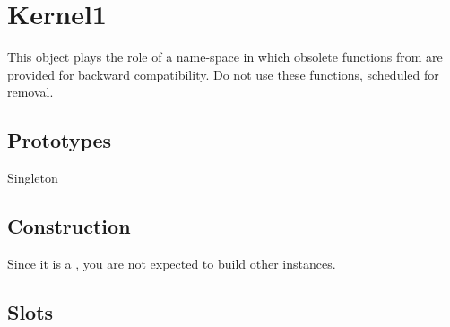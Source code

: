 
\section{Kernel1}

This object plays the role of a name-space in which obsolete functions
from  are provided for backward compatibility.  Do not use
these functions, scheduled for removal.

\subsection{Prototypes}
\begin{refObjects}
\item[Singleton]
\end{refObjects}

\subsection{Construction}

Since it is a , you are not expected to build
other instances.

\subsection{Slots}

